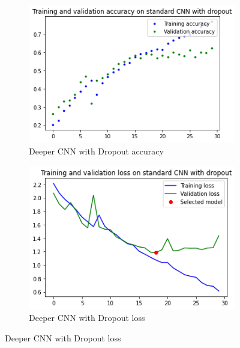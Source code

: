 \medskip


\begin{figure}[H]
	\begin{subfigure}{0.5\textwidth}
		\includegraphics[width=0.9\linewidth]{img/scratch/deeper_dropout_acc.png} 
		\caption{Deeper CNN with Dropout accuracy}
		\label{fig:DeeperDroupoutacc}
	\end{subfigure}
	\begin{subfigure}{0.5\textwidth}
		\includegraphics[width=0.9\linewidth]{img/scratch/deeper_dropout_loss.png}
		\caption{Deeper CNN with Dropout loss}
		\label{fig:DeeperDropoutloss}
	\end{subfigure}
\end{figure}

\medskip

